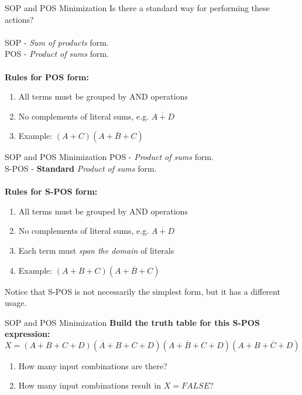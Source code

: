 \documentclass{beamer}
\begin{document}
\begin{frame}{SOP and POS Minimization}
Is there a standard way for performing these actions? \\ \hrulefill \\
\alert{SOP} - \textit{Sum of products} form. \\
\alert{POS - \textit{Product of sums} form.} \\ \hrulefill \\
\textbf{Rules for POS form:}
\begin{enumerate}
\item All terms must be grouped by AND operations
\item No complements of literal sums, e.g. $\overline{A+D}$
\item Example: $(A+C)(A+\overline{B}+C)$
\end{enumerate}
\end{frame}

\begin{frame}{SOP and POS Minimization}
\alert{POS} - \textit{Product of sums} form. \\
\alert{S-POS - \textbf{Standard} \textit{Product of sums} form.} \\ \hrulefill \\
\textbf{Rules for S-POS form:}
\begin{enumerate}
\item All terms must be grouped by AND operations
\item No complements of literal sums, e.g. $\overline{A+D}$
\item Each term must \textit{span the domain} of literals
\item Example: $(A+B+C)(A+\overline{B}+C)$
\end{enumerate}
Notice that S-POS is not necessarily the simplest form, but it has a different usage.
\end{frame}

\begin{frame}{SOP and POS Minimization}
\textbf{Build the truth table for this S-POS expression:}
\begin{equation}
X = (A+B+C+D)(\overline{A}+B+C+D)(A+\overline{B}+C+D)(A+B+\overline{C}+D)
\end{equation}
\begin{enumerate}
\item How many input combinations are there?
\item How many input combinations result in $X = FALSE$?
\end{enumerate}
\end{frame}
\end{document}
